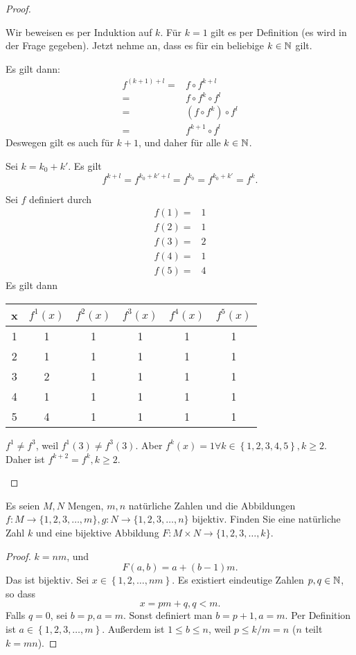 \begin{proof}
	\begin{parts}
	\item Wir beweisen es per Induktion auf $k$. F\"{u}r $k=1$ gilt es per Definition (es wird in der Frage gegeben). Jetzt nehme an, dass es f\"{u}r ein beliebige $k\in\mathbb{N}$ gilt. 
	
		Es gilt dann:
		\begin{align*}
			f^{(k+1)+l}=&f\circ f^{k+l}\\
			=&f\circ f^k\circ f^l\\
			=&(f\circ f^k)\circ f^l\\
			=& f^{k+1}\circ f^l
		\end{align*}
		Deswegen gilt es auch f\"{u}r $k+1$, und daher f\"{u}r alle $k\in \mathbb{N}$.
	\item Sei $k=k_0+k'$. Es gilt
		\[
			f^{k+l}=f^{k_0+k'+l}=f^{k_0}=f^{k_0+k'}=f^k
		.\] 
	\item Sei $f$ definiert durch
		\begin{align*}
			f(1)=&1\\
			f(2)=&1\\
			f(3)=&2\\
			f(4)=&1\\
			f(5)=&4
		\end{align*}
		Es gilt dann
		\begin{center}
			\begin{tabular}{cccccc}
				\toprule
				x & $f^1(x)$ & $f^2(x)$ & $f^3(x)$ & $f^4(x)$ & $f^5(x)$\\\midrule
				1 & 1 & 1 & 1 & 1 & 1\\\midrule
				2 & 1 & 1 & 1 & 1 & 1\\\midrule
				3 & 2 & 1 & 1 & 1 & 1\\\midrule
				4 & 1 & 1 & 1 & 1 & 1\\\midrule
				5 & 4 & 1 & 1 & 1 & 1\\\bottomrule
			\end{tabular}
		\end{center}
		$f^1\neq f^3$, weil $f^1(3)\neq f^3(3)$. Aber $f^k(x)=1\forall k \in \left\{ 1,2,3,4,5 \right\} , k\ge 2$. Daher ist $f^{k+2}=f^k, k\ge 2$.\qedhere
	\end{parts}
\end{proof}
\begin{Problem}
	Es seien $M, N$ Mengen, $m, n$ nat\"{u}rliche Zahlen und die Abbildungen $f : M \to \{1, 2, 3, \dots , m\}, g : N \to \{1, 2, 3,\dots , n\}$ bijektiv. Finden Sie eine nat\"{u}rliche Zahl $k$ und eine bijektive Abbildung $F : M \times  N \to \{1, 2, 3, \dots , k\}$.
\end{Problem}
\begin{proof}
	$k=nm$, und
	\[
	F(a,b)=a+(b-1)m
	.\] 
	Das ist bijektiv. Sei $x\in\left\{ 1,2,\dots,nm \right\} $. Es existiert eindeutige Zahlen $p,q\in\mathbb{N}$, so dass
	\[
	x=pm+q, q<m
	.\] 
	Falls $q=0$, sei $b=p,a=m$. Sonst definiert man $b=p+1,a=m$. Per Definition ist $a\in \left\{ 1,2,3,\dots,m \right\} $. Außerdem ist $1\le b\le n$, weil $p\le k / m=n$ ($n$ teilt $k=mn$).
\end{proof}
